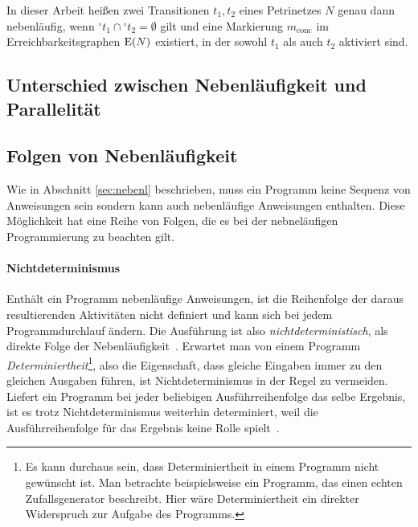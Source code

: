 In dieser Arbeit heißen zwei Transitionen $t_1, t_2$ eines Petrinetzes $N$ genau dann nebenläufig, wenn ${}^\circ t_1 \cap {}^\circ t_2 = \emptyset$ gilt und eine Markierung $m_\text{conc}$ im Erreichbarkeitsgraphen $\operatorname{E}(N)$ existiert, in der sowohl $t_1$ als auch $t_2$ aktiviert sind.

\subsection{Unterschied zwischen Nebenläufigkeit und Parallelität}

\subsection{Folgen von Nebenläufigkeit}\label{sec:nebenl-folgen}
Wie in Abschnitt \ref{sec:nebenl} beschrieben, muss ein Programm keine Sequenz von Anweisungen sein sondern kann auch nebenläufige Anweisungen enthalten. Diese Möglichkeit hat eine Reihe von Folgen, die es bei der nebneläufigen Programmierung zu beachten gilt.
\paragraph{Nichtdeterminismus}
Enthält ein Programm nebenläufige Anweisungen, ist die Reihenfolge der daraus resultierenden Aktivitäten nicht definiert und kann sich bei jedem Programmdurchlauf ändern. Die Ausführung ist also \emph{nichtdeterministisch}, als direkte Folge der Nebenläufigkeit~\cite[S.~17~f.]{Herrtwich1989}. Erwartet man von einem Programm \emph{Determiniertheit}\footnote{Es kann durchaus sein, dass Determiniertheit in einem Programm nicht gewünscht ist. Man betrachte beispielsweise ein Programm, das einen echten Zufallsgenerator beschreibt. Hier wäre Determiniertheit ein direkter Widerspruch zur Aufgabe des Programms.}, also die Eigenschaft, dass gleiche Eingaben immer zu den gleichen Ausgaben führen, ist Nichtdeterminismus in der Regel zu vermeiden. Liefert ein Programm bei jeder beliebigen Ausführreihenfolge das selbe Ergebnis, ist es trotz Nichtdeterminismus weiterhin determiniert, weil die Ausführreihenfolge für das Ergebnis keine Rolle spielt~\cite[S.~18~f.]{Herrtwich1989}. 
